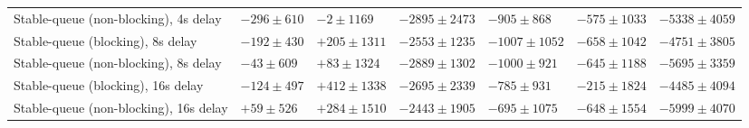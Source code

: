 \begin{table}[H]
{\begin{tabular}{l w{c}{5.0em} w{c}{5.0em} w{c}{5.0em} w{c}{5.0em} w{c}{5.0em} w{c}{5.0em}}
Stable-queue (non-blocking), 4s delay & $-296\pm610$ & $-2\pm1169$ & $-2895\pm2473$ & $-905\pm868$ & $-575\pm1033$ & $-5338\pm4059$ \\
Stable-queue (blocking), 8s delay & $-192\pm430$ & $+205\pm1311$ & $-2553\pm1235$ & $-1007\pm1052$ & $-658\pm1042$ & $-4751\pm3805$ \\
Stable-queue (non-blocking), 8s delay & $-43\pm609$ & $+83\pm1324$ & $-2889\pm1302$ & $-1000\pm921$ & $-645\pm1188$ & $-5695\pm3359$ \\
Stable-queue (blocking), 16s delay & $-124\pm497$ & $+412\pm1338$ & $-2695\pm2339$ & $-785\pm931$ & $-215\pm1824$ & $-4485\pm4094$ \\
Stable-queue (non-blocking), 16s delay & $+59\pm526$ & $+284\pm1510$ & $-2443\pm1905$ & $-695\pm1075$ & $-648\pm1554$ & $-5999\pm4070$ \\
\bottomrule
\end{tabular}%
}
\end{table}
